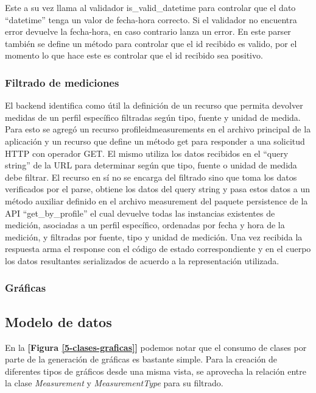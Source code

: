 Este a su vez llama al validador is\_valid\_datetime para controlar que el dato ``datetime'' tenga un valor de fecha-hora correcto. Si el validador no encuentra error devuelve la fecha-hora, en caso contrario lanza un error.
En este parser también se define un método para controlar que el id recibido es valido, por el momento lo que hace este es controlar que el id recibido sea positivo.

\subsubsection{Filtrado de mediciones}
El backend identifica como útil la definición de un recurso que permita devolver medidas de un perfil específico filtradas según tipo, fuente y unidad de medida. Para esto se agregó un recurso \/profile\/id\/measurements en el archivo principal de la aplicación y un recurso que define un método get para responder a una solicitud HTTP con operador GET. El mismo utiliza los datos recibidos en el ``query string'' de la URL para determinar según que tipo, fuente o unidad de medida debe filtrar. El recurso en sí no se encarga del filtrado sino que toma los datos verificados por el parse, obtiene los datos del query string y pasa estos datos a un método auxiliar definido en el archivo measurement del paquete persistence de la API ``get\_by\_profile'' el cual devuelve todas las instancias existentes de medición, asociadas a un perfil específico, ordenadas por fecha y hora de la medición, y filtradas por fuente, tipo y unidad de medición. Una vez recibida la respuesta arma el response con el código de estado correspondiente y en el cuerpo los datos resultantes serializados de acuerdo a la representación utilizada.




\subsubsection{Gráficas}




\subsection{Modelo de datos} 

En la \textbf{[Figura \ref{5-clases-graficas}]} podemos notar que el consumo de clases por parte de la generación de gráficas es bastante simple. Para la creación de diferentes tipos de gráficos desde una misma vista, se aprovecha la relación entre la clase \textit{Measurement} y \textit{MeasurementType} para su filtrado.

